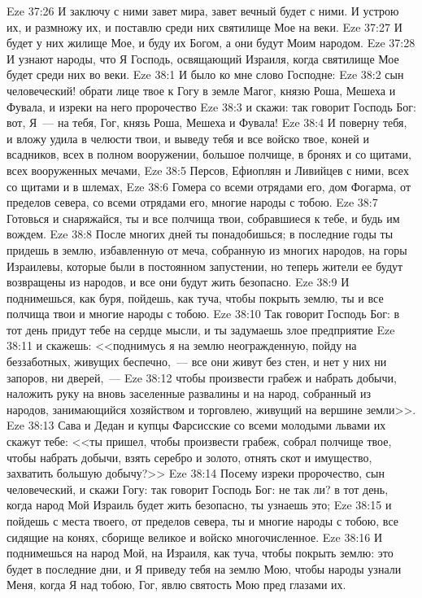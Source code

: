 \vs Eze 37:26 И заключу с ними завет мира, завет вечный будет с ними. И устрою их, и размножу их, и поставлю среди них святилище Мое на веки.
\vs Eze 37:27 И будет у них жилище Мое, и буду их Богом, а они будут Моим народом.
\vs Eze 37:28 И узнают народы, что Я Господь, освящающий Израиля, когда святилище Мое будет среди них во веки.
\vs Eze 38:1 И было ко мне слово Господне:
\vs Eze 38:2 сын человеческий! обрати лице твое к Гогу в земле Магог, князю Роша, Мешеха и Фувала, и изреки на него пророчество
\vs Eze 38:3 и скажи: так говорит Господь Бог: вот, Я~--- на тебя, Гог, князь Роша, Мешеха и Фувала!
\vs Eze 38:4 И поверну тебя, и вложу удила в челюсти твои, и выведу тебя и все войско твое, коней и всадников, всех в полном вооружении, большое полчище, в бронях и со щитами, всех вооруженных мечами,
\vs Eze 38:5 Персов, Ефиоплян и Ливийцев с ними, всех со щитами и в шлемах,
\vs Eze 38:6 Гомера со всеми отрядами его, дом Фогарма, от пределов севера, со всеми отрядами его, многие народы с тобою.
\vs Eze 38:7 Готовься и снаряжайся, ты и все полчища твои, собравшиеся к тебе, и будь им вождем.
\vs Eze 38:8 После многих дней ты понадобишься; в последние годы ты придешь в землю, избавленную от меча, собранную из многих народов, на горы Израилевы, которые были в постоянном запустении, но теперь жители ее будут возвращены из народов, и все они будут жить безопасно.
\vs Eze 38:9 И поднимешься, как буря, пойдешь, как туча, чтобы покрыть землю, ты и все полчища твои и многие народы с тобою.
\vs Eze 38:10 Так говорит Господь Бог: в тот день придут тебе на сердце мысли, и ты задумаешь злое предприятие
\vs Eze 38:11 и скажешь: <<поднимусь я на землю неогражденную, пойду на беззаботных, живущих беспечно,~--- все они живут без стен, и нет у них ни запоров, ни дверей,~---
\vs Eze 38:12 чтобы произвести грабеж и набрать добычи, наложить руку на вновь заселенные развалины и на народ, собранный из народов, занимающийся хозяйством и торговлею, живущий на вершине земли>>.
\vs Eze 38:13 Сава и Дедан и купцы Фарсисские со всеми молодыми львами их скажут тебе: <<ты пришел, чтобы произвести грабеж, собрал полчище твое, чтобы набрать добычи, взять серебро и золото, отнять скот и имущество, захватить большую добычу?>>
\vs Eze 38:14 Посему изреки пророчество, сын человеческий, и скажи Гогу: так говорит Господь Бог: не так ли? в тот день, когда народ Мой Израиль будет жить безопасно, ты узнаешь это;
\vs Eze 38:15 и пойдешь с места твоего, от пределов севера, ты и многие народы с тобою, все сидящие на конях, сборище великое и войско многочисленное.
\vs Eze 38:16 И поднимешься на народ Мой, на Израиля, как туча, чтобы покрыть землю: это будет в последние дни, и Я приведу тебя на землю Мою, чтобы народы узнали Меня, когда Я над тобою, Гог, явлю святость Мою пред глазами их.

